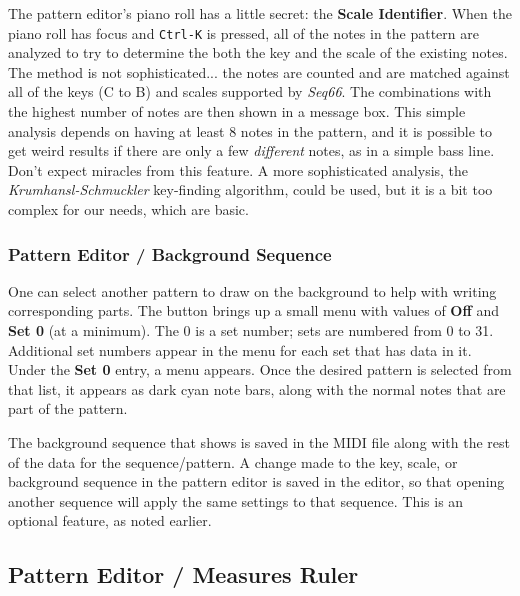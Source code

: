    The pattern editor's piano roll has a little secret:
   the \textbf{Scale Identifier}.
   When the piano roll has focus and \texttt{Ctrl-K} is pressed,
   all of the notes in the pattern are analyzed to try to determine
   the both the key and the scale of the existing notes.
   The method is not sophisticated... the notes are counted and are matched
   against all of the keys (C to B) and scales supported by \textsl{Seq66}.
   The combinations with the highest number of notes are then shown in a
   message box.
   This simple analysis depends on having at least 8 notes in the pattern, and
   it is possible to get weird results if
   there are only a few \textsl{different}
   notes, as in a simple bass line.
   Don't expect miracles from this feature.
   A more sophisticated analysis, the
   \textsl{Krumhansl-Schmuckler} key-finding
   algorithm, could be used, but it is a bit too complex
   for our needs, which are basic.

\subsubsection{Pattern Editor / Background Sequence}
\label{subsubsec:pattern_editor_second_row_background_sequence}

   One can select another pattern to draw on the background to help with
   writing corresponding parts.
   The button brings up a small menu with values of \textbf{Off} and
   \textbf{Set 0} (at a minimum).
   The 0 is a set number; sets are numbered from 0 to 31.
   Additional set numbers appear in the menu for each set that has data in it.
   Under the \textbf{Set 0} entry, a menu appears.
   Once the desired pattern is selected from that list, it appears as dark cyan
   note bars, along with the normal notes that are part of the pattern.

   The background sequence that shows is saved in the MIDI file
   along with the rest of the data for the sequence/pattern.
   A change made to the key, scale, or background sequence in
   the pattern editor is saved in the editor, so that opening another sequence
   will apply the same settings to that sequence.
   This is an optional feature, as noted earlier.

\subsection{Pattern Editor / Measures Ruler}
\label{subsec:pattern_editor_measures_ruler}


